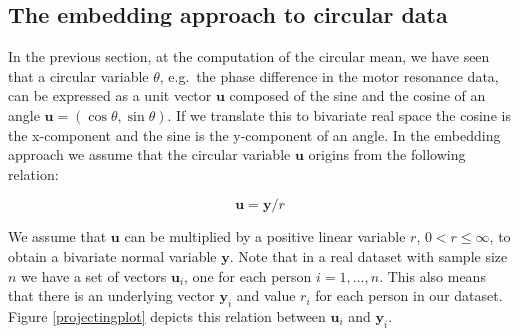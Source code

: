 \documentclass[11pt,]{article}
\begin{document}
\subsection{The embedding approach to circular data}\label{EmbeddingApproach}

In the previous section, at the computation of the circular mean, we
have seen that a circular variable \(\theta\), e.g.~the phase difference
in the motor resonance data, can be expressed as a unit vector
\(\boldsymbol{u}\) composed of the sine and the cosine of an angle
\(\boldsymbol{u} = (\cos\theta, \sin\theta)\). If we translate this to
bivariate real space the cosine is the x-component and the sine is the
y-component of an angle. In the embedding approach we assume that the
circular variable \(\boldsymbol{u}\) origins from the following
relation:

\begin{equation}\label{embedding}
 \boldsymbol{u} = \boldsymbol{y} / r 
\end{equation}

We assume that \(\boldsymbol{u}\) can be multiplied by a positive linear
variable \(r\), \(0 < r \leq \infty\), to obtain a bivariate normal
variable \(\boldsymbol{y}\). Note that in a real dataset with sample
size \(n\) we have a set of vectors \(\boldsymbol{u}_{i}\), one for each
person \(i = 1, \dots, n\). This also means that there is an underlying
vector \(\boldsymbol{y}_{i}\) and value \(r_{i}\) for each person in our
dataset. Figure \ref{projectingplot} depicts this relation between
\(\boldsymbol{u}_{i}\) and \(\boldsymbol{y}_{i}\).
\end{document}
